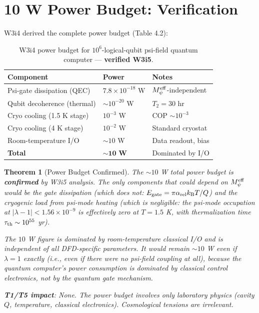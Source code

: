 \documentclass[11pt]{article}
\newtheorem{theorem}{Theorem}[section]
\theoremstyle{definition}
\theoremstyle{remark}
\newcommand{\kB}{k_{\mathrm{B}}}
\newcommand{\arel}{\alpha_{\mathrm{rel}}}
\newcommand{\lam}{\lambda}
\newcommand{\Meff}{M_\psi^{\rm eff}}
\newcommand{\ee}[1]{\times 10^{#1}}
\begin{document}
\section{10 W Power Budget: Verification}
\label{sec:power_budget_verification}

W3i4 derived the complete power budget (Table 4.2):

\begin{table}[h]
\centering
\caption{W3i4 power budget for $10^6$-logical-qubit psi-field quantum
computer --- \textbf{verified W3i5}.}
\label{tab:power_budget_w3i5}
\begin{tabular}{@{}lll@{}}
\toprule
Component & Power & Notes \\
\midrule
Psi-gate dissipation (QEC) & $7.8\ee{-18}$ W
  & $\Meff$-independent \\
Qubit decoherence (thermal) & $\sim 10^{-20}$ W
  & $T_2 = 30$ hr \\
Cryo cooling (1.5 K stage) & $10^{-3}$ W
  & COP $\sim 10^{-3}$ \\
Cryo cooling (4 K stage) & $10^{-2}$ W
  & Standard cryostat \\
Room-temperature I/O & $\sim 10$ W
  & Data readout, bias \\
\midrule
\textbf{Total} & $\mathbf{\sim 10}$ \textbf{W}
  & Dominated by I/O \\
\bottomrule
\end{tabular}
\end{table}

\begin{theorem}[Power Budget Confirmed]
\label{thm:power_confirmed}
The $\sim 10$ W total power budget is \textbf{confirmed} by W3i5 analysis.
The only components that could depend on $\Meff$ would be the gate
dissipation (which does not: $E_{\rm gate} = \pi\arel\kB T/Q$) and the
cryogenic load from psi-mode heating (which is negligible: the psi-mode
occupation at $|\lam-1| < 1.56\ee{-9}$ is effectively zero at
$T = 1.5$ K, with thermalization time $\tau_{\rm th} \sim 10^{55}$ yr).

The $10$ W figure is dominated by room-temperature classical I/O and
is independent of all DFD-specific parameters. It would remain $\sim 10$ W
even if $\lam = 1$ exactly (i.e., even if there were no psi-field coupling
at all), because the quantum computer's power consumption is dominated by
classical control electronics, not by the quantum gate mechanism.

\textbf{T1/T5 impact}: None. The power budget involves only laboratory
physics (cavity $Q$, temperature, classical electronics). Cosmological
tensions are irrelevant.
\end{theorem}
\end{document}
